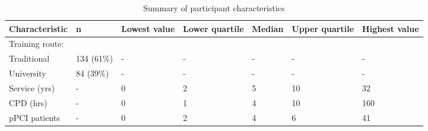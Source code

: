 \begin{table}[htbp]
\centering
\caption{Summary of participant characteristics} 
\label{partcharfull}
\begin{tabular}{BKNNNNN}
  \hline
Characteristic & n & Lowest value & Lower quartile & Median & Upper quartile & Highest value \\ 
  \hline
Training route: &   &   &   &   &   &   \\ 
  Traditional & 134 (61\%) & - & - & - & - & - \\ 
  University & 84 (39\%) & - & - & - & - & - \\ 
  Service (yrs) & - & 0 & 2 & 5 & 10 & 32 \\ 
  CPD (hrs) & - & 0 & 1 & 4 & 10 & 160 \\ 
  pPCI patients & - & 0 & 2 & 4 & 6 & 41 \\ 
   \hline
\end{tabular}
\end{table}
